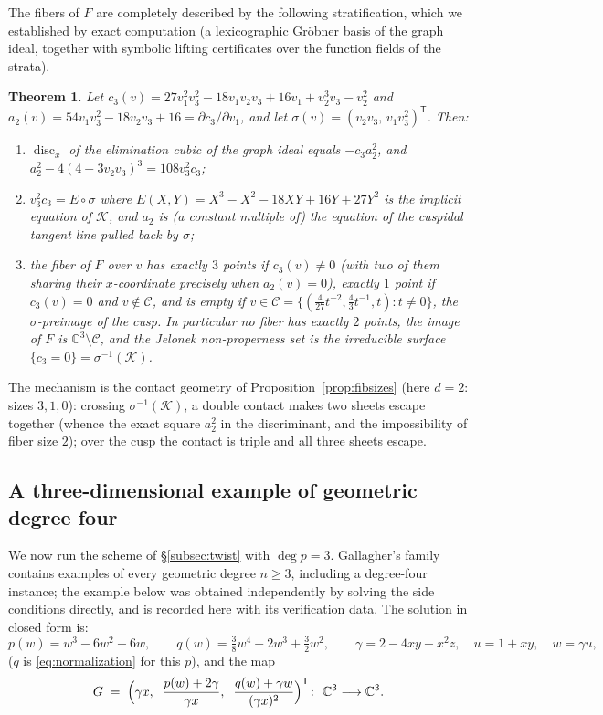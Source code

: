 \documentclass[11pt]{article}
\theoremstyle{plain}
\newtheorem{theorem}{Theorem}[section]
\theoremstyle{definition}
\theoremstyle{remark}
\newcommand{\C}{\mathbb{C}}
\begin{document}
The fibers of $F$ are completely described by the following stratification, which
we established by exact computation (a lexicographic Gr\"obner basis of the graph
ideal, together with symbolic lifting certificates over the function fields of the
strata).

\begin{theorem}\label{thm:strat3}
Let $c_3(v)=27v_1^2v_3^2-18v_1v_2v_3+16v_1+v_2^3v_3-v_2^2$ and
$a_2(v)=54v_1v_3^2-18v_2v_3+16=\partial c_3/\partial v_1$, and let
$\sigma(v)=(v_2v_3,\,v_1v_3^2)^{\mathsf T}$. Then:
\begin{enumerate}
\item $\operatorname{disc}_x$ of the elimination cubic of the graph ideal equals
$-c_3a_2^2$, and $a_2^2-4(4-3v_2v_3)^3=108v_3^2c_3$;
\item $v_3^2c_3=E\circ\sigma$ where $E(X,Y)=X^3-X^2-18XY+16Y+27Y^2$ is the
implicit equation of $\mathcal{K}$, and $a_2$ is (a constant multiple of) the
equation of the cuspidal tangent line pulled back by $\sigma$;
\item the fiber of $F$ over $v$ has exactly $3$ points if $c_3(v)\ne0$ (with two
of them sharing their $x$-coordinate precisely when $a_2(v)=0$), exactly $1$
point if $c_3(v)=0$ and $v\notin\mathcal{C}$, and is empty if
$v\in\mathcal{C}=\{(\tfrac4{27}t^{-2},\tfrac43t^{-1},t):t\ne0\}$, the
$\sigma$-preimage of the cusp. In particular no fiber has exactly $2$ points, the
image of $F$ is $\C^3\setminus\mathcal{C}$, and the Jelonek non-properness set is
the irreducible surface $\{c_3=0\}=\sigma^{-1}(\mathcal{K})$.
\end{enumerate}
\end{theorem}

The mechanism is the contact geometry of
Proposition~\ref{prop:fibsizes} (here $d=2$: sizes $3,1,0$): crossing
$\sigma^{-1}(\mathcal K)$, a double contact makes two sheets escape together
(whence the exact square $a_2^2$ in the discriminant, and the impossibility of
fiber size $2$); over the cusp the contact is triple and all three sheets escape.

\subsection{A three-dimensional example of geometric degree four}\label{sec:deg4}

We now run the scheme of \S\ref{subsec:twist} with $\deg p=3$. Gallagher's
family \cite{Gallagher2026} contains examples of every geometric degree
$n\ge3$, including a degree-four instance; the example below was obtained
independently by solving the side conditions directly, and is recorded here with
its verification data. The solution in closed form is:
\[
p(w)=w^3-6w^2+6w,\qquad
q(w)=\tfrac38 w^4-2w^3+\tfrac32 w^2,\qquad
\gamma=2-4xy-x^2z,\quad u=1+xy,\quad w=\gamma u ,
\]
($q$ is \eqref{eq:normalization} for this $p$), and the map
\[
G\;=\;\Bigl(\gamma x,\;\;\frac{p(w)+2\gamma}{\gamma x},\;\;
\frac{q(w)+\gamma w}{(\gamma x)^2}\Bigr)^{\mathsf T}\colon\ \C^3\longrightarrow\C^3 .
\]
\end{document}

